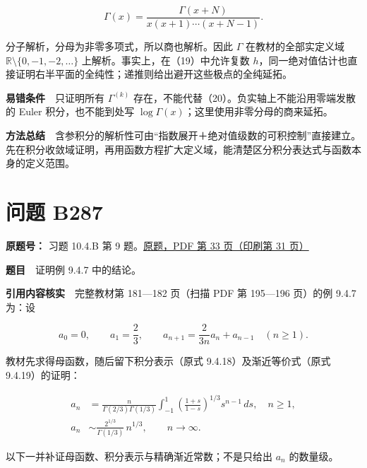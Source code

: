 \documentclass[11pt,a4paper]{article}
\begin{document}
\begin{equation}
\Gamma(x)=\frac{\Gamma(x+N)}
{x(x+1)\cdots(x+N-1)}.
\tag{21}
\end{equation}

分子解析，分母为非零多项式，所以商也解析。因此 \(\Gamma\)
在教材的全部实定义域 \(\mathbb R\setminus\{0,-1,-2,\ldots\}\)
上解析。事实上，在（19）中允许复数
\(h\)，同一绝对值估计也直接证明右半平面的全纯性；递推则给出避开这些极点的全纯延拓。

\textbf{易错条件}　只证明所有 \(\Gamma^{(k)}\)
存在，不能代替（20）。负实轴上不能沿用零端发散的 Euler
积分，也不能到处写 \(\log\Gamma(x)\)；这里使用非零分母的商来延拓。

\textbf{方法总结}　含参积分的解析性可由``指数展开＋绝对值级数的可积控制''直接建立。先在积分收敛域证明，再用函数方程扩大定义域，能清楚区分积分表达式与函数本身的定义范围。

\section{问题 B287}\label{ux95eeux9898-b287}

\textbf{原题号：} 习题 10.4.B 第 9
题。\href{https://zj139.github.io/math-notes/files/problems/楼分析习题-v2.pdf\#page=33}{原题，PDF
第 33 页（印刷第 31 页）}

\textbf{题目}　证明例 9.4.7 中的结论。

\textbf{引用内容核实}　完整教材第 181---182 页（扫描 PDF 第 195---196
页）的例 9.4.7 为：设

\begin{equation}
a_0=0,\qquad a_1=\frac23,\qquad
a_{n+1}=\frac{2}{3n}a_n+a_{n-1}\quad(n\ge1).
\tag{22}
\end{equation}

教材先求得母函数，随后留下积分表示（原式 9.4.18）及渐近等价式（原式
9.4.19）的证明：

\begin{equation}
\begin{aligned}
a_n&=\frac{n}{\Gamma(2/3)\Gamma(1/3)}
\int_{-1}^1\left(\frac{1+s}{1-s}\right)^{1/3}s^{n-1}\,ds,\quad n\ge1,\\
a_n&\sim\frac{2^{1/3}}{\Gamma(1/3)}\,n^{1/3},
\qquad n\to\infty.
\end{aligned}
\tag{23}
\end{equation}

以下一并补证母函数、积分表示与精确渐近常数；不是只给出 \(a_n\)
的数量级。
\end{document}
